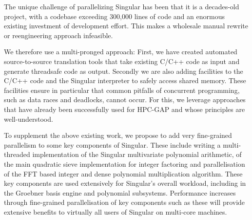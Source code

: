 \begin{workpackage}[id=hpc,wphases=36-48,
  title=High Performance Computing,
  PSRM=1, %
  LLRM=12, %
  SARM=1, %
  UKRM=1, %
  UBRM=1, %
  UJFRM=12]
\begin{tasklist}
\begin{task}[title=Linbox,id=hpc_linbox]

\end{task}

\begin{task}[title=Singular]
  \label{task:hpc_singular}
  The unique challenge of parallelizing Singular has been that it is a decades-old
  project, with a codebase exceeding 300,000 lines of code and an enormous existing
  investment of development effort. This makes a wholesale manual rewrite or reengineering
  approach infeasible.

  We therefore use a multi-pronged approach: First, we have created automated
  source-to-source translation tools that take existing C/C++ code as input and generate
  threadsafe code as output. Secondly we are also adding facilities to the C/C++ code and
  the Singular interpreter to safely access shared memory. These facilities ensure in
  particular that common pitfalls of concurrent programming, such as data races and
  deadlocks, cannot occur. For this, we leverage approaches that have already been
  successfully used for HPC-GAP and whose principles are well-understood.

  To supplement the above existing work, we propose to add very fine-grained parallelism
  to some key components of Singular. These include writing a multi-threaded
  implementation of the Singular multivariate polynomial arithmetic, of the main quadratic
  sieve implementation for integer factoring and parallelisation of the FFT based integer
  and dense polynomial multiplication algorithm. These key components are used extensively
  for Singular's overall workload, including in the Groebner basis engine and polynomial
  subsystems. Performance increases through fine-grained parallelisation of key components
  such as these will provide extensive benefits to virtually all users of Singular on
  multi-core machines.
\end{task}


\end{tasklist}
\end{workpackage}

